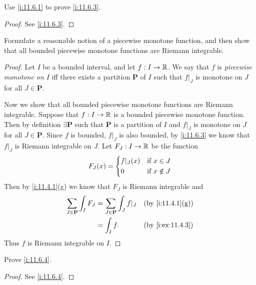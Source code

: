 \exercisesection

\begin{ex}\label{i:ex:11.6.1}
  Use \cref{i:11.6.1} to prove \cref{i:11.6.3}.
\end{ex}

\begin{proof}
  See \cref{i:11.6.3}.
\end{proof}

\begin{ex}\label{i:ex:11.6.2}
  Formulate a reasonable notion of a piecewise monotone function, and then show that all bounded piecewise monotone functions are Riemann integrable.
\end{ex}

\begin{proof}
  Let \(I\) be a bounded interval, and let \(f : I \to \mathbb{R}\).
  We say that \(f\) is \emph{piecewise monotone on \(I\)} iff there exists a partition \(\mathbf{P}\) of \(I\) such that \(f|_J\) is monotone on \(J\) for all \(J \in \mathbf{P}\).

  Now we show that all bounded piecewise monotone functions are Riemann integrable.
  Suppose that \(f : I \to \mathbb{R}\) is a bounded piecewise monotone function.
  Then by definition \(\exists \mathbf{P}\) such that \(\mathbf{P}\) is a partition of \(I\) and \(f|_J\) is monotone on \(J\) for all \(J \in \mathbf{P}\).
  Since \(f\) is bounded, \(f|_J\) is also bounded, by \cref{i:11.6.3} we know that \(f|_J\) is Riemann integrable on \(J\).
  Let \(F_J : I \to \mathbb{R}\) be the function
  \[
    F_J(x) = \begin{dcases}
      f|_J(x) & \text{if } x \in J    \\
      0       & \text{if } x \notin J
    \end{dcases}
  \]
  Then by \cref{i:11.4.1}(g) we know that \(F_J\) is Riemann integrable and
  \begin{align*}
    \sum_{J \in \mathbf{P}} \int_I F_J & = \sum_{J \in \mathbf{P}} \int_J f|_J &  & \by{i:11.4.1}[g] \\
                                       & = \int_I f.                           &  & \by{i:ex:11.4.3}
  \end{align*}
  Thus \(f\) is Riemann integrable on \(I\).
\end{proof}

\begin{ex}\label{i:ex:11.6.3}
  Prove \cref{i:11.6.4}.
\end{ex}

\begin{proof}
  See \cref{i:11.6.4}.
\end{proof}

